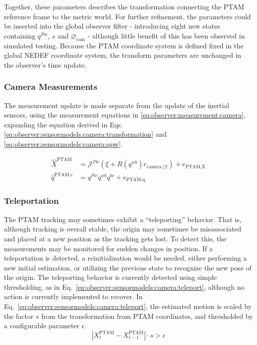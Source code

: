         Together, these parameters describes the transformation
        connecting the PTAM reference frame to the metric world.
        For further refinement, the parameters could be inserted into the
        global observer filter - introducing eight new states containing
        $q^{Pw}$, $s$ and $\varnothing_{\text{cam}}$ - although little benefit
        of this has been observed in simulated testing.
        Because the PTAM coordinate system is defined fixed in the global NEDEF coordinate system,
        the transform parameters are unchanged in the observer's time update.

    \subsubsection{Camera Measurements}
        \label{sssec:observer:sensormodels:camera:refinement}
        The measurement update is made separate from the update of the inertial sensors, using
        the measurement equations in \eqref{eq:observer:measurement:camera}, expanding the
        equation derived in Eqs. \eqref{eq:observer:sensormodels:camera:transformation} and \eqref{eq:observer:sensormodels:camera:qpw}.

        \begin{subequations}
            \label{eq:observer:measurement:camera}
            \begin{align}
                \hat{X}^{\text{PTAM}} &= \mathcal{J}^{Pw} (\xi + R(q^{wb})r_{\text{camera}/\mathcal{G}}) + e_{\text{PTAM,X}} \\
                \hat{q}^{\text{PTAM,c}} &= q^{Pw} q^{wb} q^{bc} + e_{\text{PTAM,q}}
            \end{align}
        \end{subequations}

    \subsubsection{Teleportation}
        \label{sssec:observer:sensormodels:camera:teleportation}
        The PTAM tracking may sometimes exhibit a ``teleporting'' behavior.
        That is, although tracking is overall stable, the origin may
        sometimes be misassociated and placed at a new position as the
        tracking gets lost.
        To detect this, the measurements may be monitored for sudden changes in position.
        If a teleportation is detected, a reinitialization would be needed,
        either performing a new initial estimation, or utilizing the previous state
        to recognize the new pose of the origin.
        The teleporting behavior is currently detected using simple thresholding,
        as in Eq.~\eqref{eq:observer:sensormodels:camera:teleport},
        although no action is currently implemented to recover.
        In Eq.~\eqref{eq:observer:sensormodels:camera:teleport}, the
        estimated motion is scaled by the factor $s$ from the transformation
        from PTAM coordinates, and thresholded by a configurable parameter $\epsilon$.
        \begin{equation}
            \label{eq:observer:sensormodels:camera:teleport}
            \left|X^{\text{PTAM}}_{t} - X^{\text{PTAM}}_{t-1}\right| \cdot s > \epsilon
        \end{equation}
